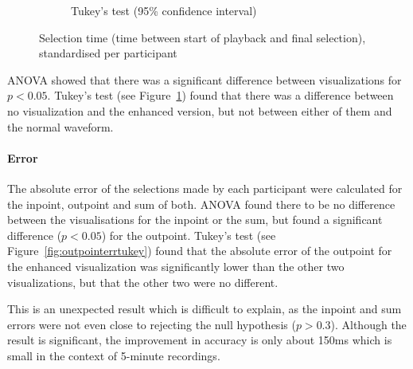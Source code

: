 \begin{figure}[ht]
\begin{subfigure}{.5\textwidth}
  \caption{Tukey's test (95\% confidence interval)}
  \label{fig:selecttimetukey}
\end{subfigure}
\caption{Selection time (time between start of playback and final selection),
    standardised per participant}
\label{fig:selecttime}
\end{figure}

ANOVA showed that there was a significant difference between visualizations for
$p < 0.05$. Tukey's test (see Figure~\ref{fig:selecttimetukey}) found that
there was a difference between no visualization and the enhanced version, but
not between either of them and the normal waveform.

\paragraph{Error}
The absolute error of the selections made by each participant were calculated
for the inpoint, outpoint and sum of both. ANOVA found there to be no
difference between the visualisations for the inpoint or the sum, but found a
significant difference ($p < 0.05$) for the outpoint.  Tukey's test (see
Figure~\ref{fig:outpointerrtukey}) found that the absolute error of the
outpoint for the enhanced visualization was significantly lower than the other
two visualizations, but that the other two were no different.

This is an unexpected result which is difficult to explain, as the inpoint and
sum errors were not even close to rejecting the null hypothesis ($p > 0.3$).
Although the result is significant, the improvement in accuracy is only about
150ms which is small in the context of 5-minute recordings.

